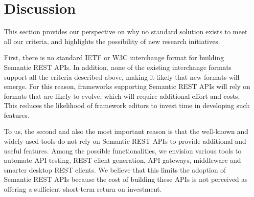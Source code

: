\vspace*{-0.3cm}
\section{Discussion} \label{sec:discussion}

\vspace*{-0.2cm}

This section provides our perspective on why no standard solution exists to meet all our criteria, and highlights the possibility of new research initiatives.

First, there is no standard IETF or W3C interchange format for building Semantic REST APIs. In addition, none of the existing interchange formats support all the criteria described above, making it likely that new formats will emerge.
For this reason, frameworks supporting Semantic REST APIs will rely on formats that are likely to evolve, which will require additional effort and costs. This reduces the likelihood of framework editors to invest time in developing such features. 

To us, the second and also the most important reason is that the well-known and widely used tools do not rely on Semantic REST APIs to provide additional and useful features. Among the possible functionalities, we envision various tools to automate API testing, REST client generation, API gateways, middleware and smarter desktop REST clients.
We believe that this limits the adoption of Semantic REST APIs because the cost of building these APIs is not perceived as offering a sufficient short-term return on investment.



